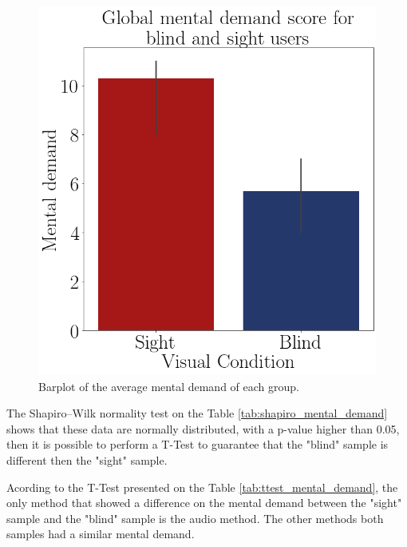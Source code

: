 \begin{figure}[!htb]
\begin{minipage}{.45\linewidth}
        \vspace{1.8cm}
        \centering
        \includegraphics[width = \linewidth]{Resultados/Nasa/Figuras/png/barplot_md_avg_global.png}
        \caption{Barplot of the average mental demand of each group.}
        \label{fig:barplot_md_global}
    \end{minipage}
\end{figure}

The Shapiro–Wilk normality test on the Table \ref{tab:shapiro_mental_demand} shows that these data are normally distributed, with a p-value higher than 0.05, then it is possible to perform a T-Test to guarantee that the "blind" sample is different then the "sight" sample.

%

Acording to the T-Test presented on the Table \ref{tab:ttest_mental_demand}, the only method that showed a difference on the mental demand between the "sight" sample and the "blind" sample is the audio method. The other methods both samples had a similar mental demand.

